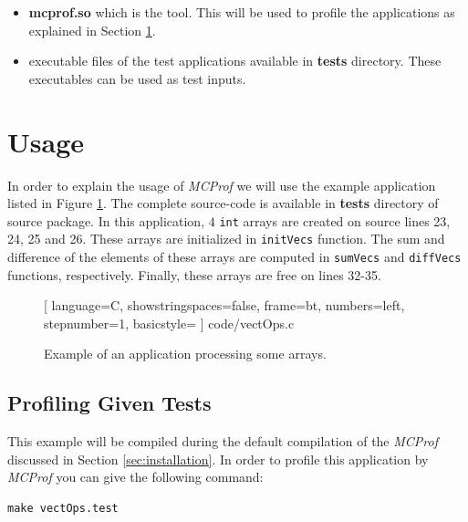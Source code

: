 \documentclass[10pt]{article}
\newcommand{\MCPROF}{\emph{MCProf}}
\begin{document}
\begin{itemize}

\item \textbf{mcprof.so} which is the tool. This will be used to profile the
    applications as explained in Section \ref{sec:usage}.

\item executable files of the test applications available in \textbf{tests}
    directory.  These executables can be used as test inputs.

\end{itemize}



\section{Usage}
\label{sec:usage}

In order to explain the usage of \MCPROF{} we will use the example application
listed in Figure \ref{fig:vectOps}. The complete source-code is available in
\textbf{tests} directory of source package. In this application, $4$ \verb|int|
arrays are created on source lines 23, 24, 25 and 26. These arrays are
initialized in \verb|initVecs| function. The sum and difference of the elements
of these arrays are computed in \verb|sumVecs| and \verb|diffVecs| functions,
respectively.  Finally, these arrays are free on lines 32-35.

\begin{figure} %
    \centering
%     
    
    [
    language=C,
    showstringspaces=false,
    frame=bt,
    numbers=left,
    stepnumber=1,
    basicstyle=\small %
    ] {code/vectOps.c}
    \caption{Example of an application processing some arrays.}
    \label{fig:vectOps}
\end{figure}


\subsection{Profiling Given Tests}

This example will be compiled during the default compilation of the \MCPROF{}
discussed in Section \ref{sec:installation}. In order to profile this
application by \MCPROF{} you can give the following command:

{
\small
\begin{Verbatim}[frame=single]
make vectOps.test
\end{Verbatim}
}
\end{document}
